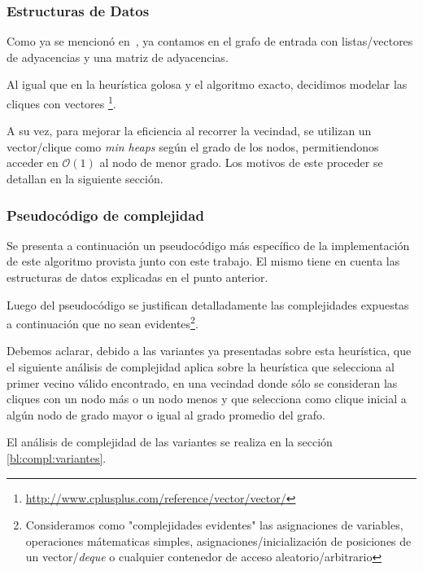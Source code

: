 \subsubsection{Estructuras de Datos}
\par Como ya se mencion\'o en~, ya contamos en el grafo
    de entrada con listas/vectores de adyacencias y una matriz de adyacencias.

\par Al igual que en la heur\'istica golosa y el algoritmo exacto, decidimos
    modelar las cliques con vectores%
    \footnote{\url{http://www.cplusplus.com/reference/vector/vector/}}.

\par A su vez, para mejorar la eficiencia al recorrer la vecindad, se
    utilizan un vector/clique como \emph{min heaps} seg\'un el grado
    de los nodos, permitiendonos acceder en $\mathcal O(1)$ al nodo
    de menor grado. Los motivos de este proceder se detallan en
    la siguiente secci\'on.

\subsubsection{Pseudoc\'odigo de complejidad\label{bl:compl}}
\par Se presenta a continuaci\'on un pseudoc\'odigo m\'as espec\'ifico de la implementaci\'on
    de este algoritmo provista junto con este trabajo. El mismo tiene en cuenta
    las estructuras de datos explicadas en el punto anterior.

\par Luego del pseudoc\'odigo se justifican detalladamente las complejidades
    expuestas a continuaci\'on que no sean evidentes\footnote{Consideramos
    como "complejidades evidentes" las asignaciones de variables, operaciones
    m\'atematicas simples, asignaciones/inicializaci\'on de posiciones de
    un vector/\emph{deque} o cualquier contenedor de acceso aleatorio/arbitrario}.

\par Debemos aclarar, debido a las variantes ya presentadas sobre esta
    heur\'istica, que el siguiente an\'alisis de complejidad aplica
    sobre la heur\'istica que selecciona al primer vecino v\'alido encontrado,
    en una vecindad donde s\'olo se consideran las cliques con un nodo m\'as
    o un nodo menos y que selecciona como clique inicial a alg\'un nodo
    de grado mayor o igual al grado promedio del grafo.

\par El an\'alisis de complejidad de las variantes se realiza en la secci\'on
    \ref{bl:compl:variantes}.

